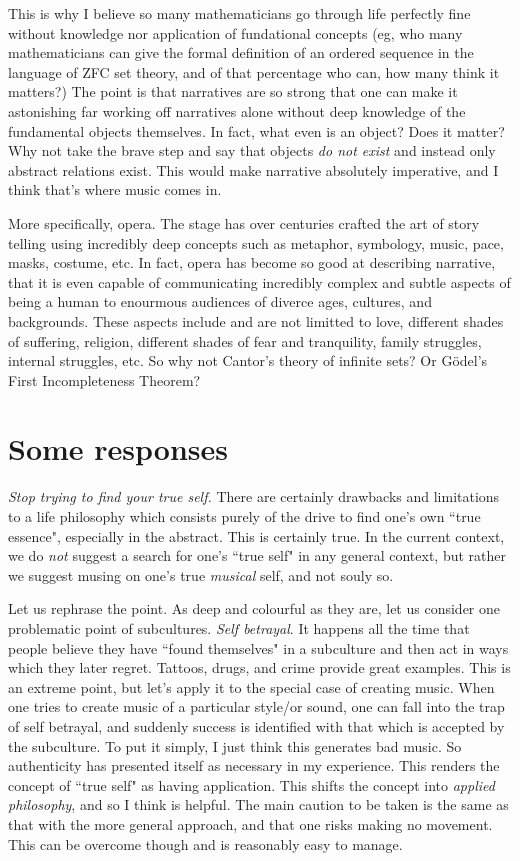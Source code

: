 \documentclass[12pt]{book}
\theoremstyle{plain}
\theoremstyle{definition}
\begin{document}
This is why I believe so many mathematicians go through life perfectly fine without knowledge nor application of fundational concepts (eg, who many mathematicians can give the formal definition of an ordered sequence in the language of ZFC set theory, and of that percentage who can, how many think it matters?) The point is that narratives are so strong that one can make it astonishing far working off narratives alone without deep knowledge of the fundamental objects themselves. In fact, what even is an object? Does it matter? Why not take the brave step and say that objects \emph{do not exist} and instead only abstract relations exist. This would make narrative absolutely imperative, and I think that's where music comes in.

More specifically, opera. The stage has over centuries crafted the art of story telling using incredibly deep concepts such as metaphor, symbology, music, pace, masks, costume, etc. In fact, opera has become so good at describing narrative, that it is even capable of communicating incredibly complex and subtle aspects of being a human to enourmous audiences of diverce ages, cultures, and backgrounds. These aspects include and are not limitted to love, different shades of suffering, religion, different shades of fear and tranquility, family struggles, internal struggles, etc. So why not Cantor's theory of infinite sets? Or G\"{o}del's First Incompleteness Theorem?

\section{Some responses}
\emph{Stop trying to find your true self.} There are certainly drawbacks and limitations to a life philosophy which consists purely of the drive to find one's own ``true essence", especially in the abstract. This is certainly true. In the current context, we do \emph{not} suggest a search for one's ``true self" in any general context, but rather we suggest musing on one's true \emph{musical} self, and not souly so.

Let us rephrase the point. As deep and colourful as they are, let us consider one problematic point of subcultures. \emph{Self betrayal}. It happens all the time that people believe they have ``found themselves" in a subculture and then act in ways which they later regret. Tattoos, drugs, and crime provide great examples. This is an extreme point, but let's apply it to the special case of creating music. When one tries to create music of a particular style/or sound, one can fall into the trap of self betrayal, and suddenly success is identified with that which is accepted by the subculture. To put it simply, I just think this generates bad music. So authenticity has presented itself as necessary in my experience. This renders the concept of ``true self" as having application. This shifts the concept into \emph{applied philosophy}, and so I think is helpful. The main caution to be taken is the same as that with the more general approach, and that one risks making no movement. This can be overcome though and is reasonably easy to manage.
\end{document}
